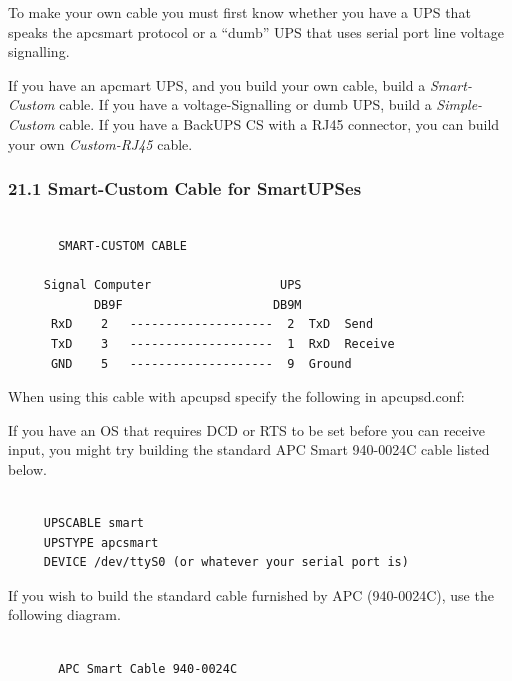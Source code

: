 {{{{{{{{{{To make your own cable you must first know whether you have a UPS that speaks
the apcsmart protocol or a ``dumb'' UPS that uses serial port line voltage
signalling.  

If you have an apcmart UPS, and you build your own cable, build a {\it
Smart-Custom} cable. If you have a voltage-Signalling or dumb UPS, build a
{\it Simple-Custom} cable. If you have a BackUPS CS with a RJ45 connector, you
can build your own {\it Custom-RJ45} cable. 

\label{Smart_002dCustom-Cable-for-SmartUPSes}

\subsubsection*{21.1 Smart-Custom Cable for SmartUPSes}

\label{index-Smart-Custom-Cable-192}
\label{index-Cables_002c-Smart-Custom-193}

\footnotesize
\begin{verbatim}
     
       SMART-CUSTOM CABLE
     
     Signal Computer                  UPS
            DB9F                     DB9M
      RxD    2   --------------------  2  TxD  Send
      TxD    3   --------------------  1  RxD  Receive
      GND    5   --------------------  9  Ground
\end{verbatim}
\normalsize

When using this cable with apcupsd specify the following in apcupsd.conf:  

If you have an OS that requires DCD or RTS to be set before you can receive
input, you might try building the standard APC Smart 940-0024C cable listed
below. 

\footnotesize
\begin{verbatim}
     
     UPSCABLE smart
     UPSTYPE apcsmart
     DEVICE /dev/ttyS0 (or whatever your serial port is)
\end{verbatim}
\normalsize

If you wish to build the standard cable furnished by APC (940-0024C), use the
following diagram. 

\footnotesize
\begin{verbatim}
     
       APC Smart Cable 940-0024C
     

\end{verbatim}}}}}}}}}}}
